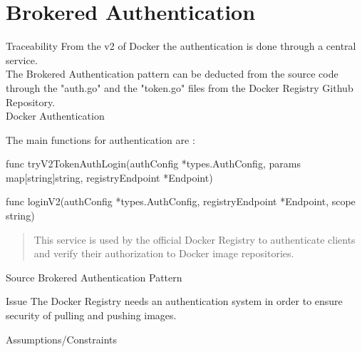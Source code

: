 \section{Brokered Authentication}

\begin{patdescription}

\item[Traceability]
From the v2 of Docker the authentication is done through a central service. \\
The Brokered Authentication pattern can be deducted from the source code through the "auth.go" and the "token.go" files from the Docker Registry Github Repository. \\
Docker Authentication \cite{dockauth}

The main functions for authentication are : \\
\begin{mynesteditemlist}
\item func tryV2TokenAuthLogin(authConfig *types.AuthConfig, params map[string]string, registryEndpoint *Endpoint)
\item func loginV2(authConfig *types.AuthConfig, registryEndpoint *Endpoint, scope string) 
\end{mynesteditemlist}

\begin{quote}
This service is used by the official Docker Registry to authenticate clients and verify their authorization to Docker image repositories.
\end{quote}

\item[Source]
Brokered Authentication Pattern\cite{brokeredauth} \\

\item[Issue] The Docker Registry needs an authentication system in order to ensure security of pulling and pushing images.

\item[Assumptions/Constraints] 



\end{patdescription}
